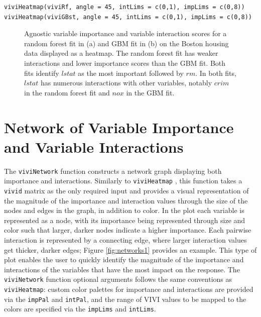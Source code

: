 \begin{verbatim}
viviHeatmap(viviRf, angle = 45, intLims = c(0,1), impLims = c(0,8))
viviHeatmap(viviGBst, angle = 45, intLims = c(0,1), impLims = c(0,8))
\end{verbatim}

\begin{figure}

{\centering {}

}

\caption{Agnostic variable importance and variable interaction scores for a random forest fit in (a) and GBM fit in (b) on the Boston housing data displayed as a heatmap. The random forest fit has weaker interactions and lower importance scores than the GBM fit. Both fits identify $lstat$ as the most important followed by $rm$. In both fits, $lstat$ has numerous interactions with other variables, notably $crim$ in the random forest fit and $nox$ in the GBM fit.}\label{fig:heatmaps}
\end{figure}

\hypertarget{networkSec}{%
\section{Network of Variable Importance and Variable Interactions}\label{networkSec}}

The \texttt{viviNetwork} function constructs a network graph displaying both importance and interactions.
Similarly to \texttt{viviHeatmap} , this function takes a \texttt{vivid} matrix as the only required input and provides a visual representation of the magnitude of the importance and interaction values through the size of the nodes and edges in the graph, in addition to color. In the plot each variable is represented as a node, with its importance being represented through size and color such that larger, darker nodes indicate a higher importance. Each pairwise interaction is represented by a connecting edge, where larger interaction values get thicker, darker edges; Figure \ref{fig:networks1} provides an example. This type of plot enables the user to quickly identify the magnitude of the importance and interactions of the variables that have the most impact on the response. The \texttt{viviNetwork} function optional arguments follows the same conventions as \texttt{viviHeatmap}: custom color palettes for importance and interactions are provided via the \texttt{impPal} and \texttt{intPal}, and the range of VIVI values to be mapped to the colors are specified via the \texttt{impLims} and \texttt{intLims}.


